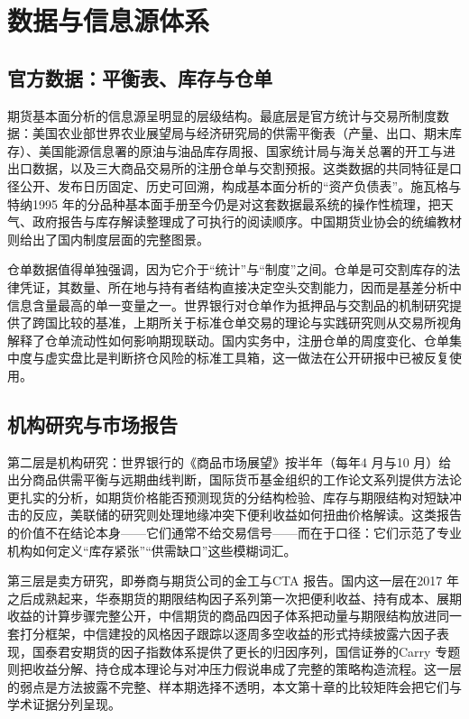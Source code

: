 \documentclass[12pt,a4paper]{ctexart}
\begin{document}
\section{数据与信息源体系}

\subsection{官方数据：平衡表、库存与仓单}

期货基本面分析的信息源呈明显的层级结构。最底层是官方统计与交易所制度数据：美国农业部世界农业展望局与经济研究局的供需平衡表（产量、出口、期末库存）、美国能源信息署的原油与油品库存周报、国家统计局与海关总署的开工与进出口数据，以及三大商品交易所的注册仓单与交割预报。这类数据的共同特征是口径公开、发布日历固定、历史可回溯，构成基本面分析的“资产负债表”。施瓦格与特纳1995 年的分品种基本面手册至今仍是对这套数据最系统的操作性梳理，把天气、政府报告与库存解读整理成了可执行的阅读顺序\cite{40}。中国期货业协会的统编教材则给出了国内制度层面的完整图景\cite{47}。

仓单数据值得单独强调，因为它介于“统计”与“制度”之间。仓单是可交割库存的法律凭证，其数量、所在地与持有者结构直接决定空头交割能力，因而是基差分析中信息含量最高的单一变量之一。世界银行对仓单作为抵押品与交割品的机制研究提供了跨国比较的基准\cite{21}，上期所关于标准仓单交易的理论与实践研究则从交易所视角解释了仓单流动性如何影响期现联动\cite{56}。国内实务中，注册仓单的周度变化、仓单集中度与虚实盘比是判断挤仓风险的标准工具箱，这一做法在公开研报中已被反复使用\cite{59, 61}。

\subsection{机构研究与市场报告}

第二层是机构研究：世界银行的《商品市场展望》按半年（每年4 月与10 月）给出分商品供需平衡与远期曲线判断\cite{55}，国际货币基金组织的工作论文系列提供方法论更扎实的分析，如期货价格能否预测现货的分结构检验\cite{50}、库存与期限结构对短缺冲击的反应\cite{51}，美联储的研究则处理地缘冲突下便利收益如何扭曲价格解读\cite{53}。这类报告的价值不在结论本身——它们通常不给交易信号——而在于口径：它们示范了专业机构如何定义“库存紧张”“供需缺口”这些模糊词汇。

第三层是卖方研究，即券商与期货公司的金工与CTA 报告。国内这一层在2017 年之后成熟起来，华泰期货的期限结构因子系列第一次把便利收益、持有成本、展期收益的计算步骤完整公开\cite{57}，中信期货的商品四因子体系把动量与期限结构放进同一套打分框架\cite{59}，中信建投的风格因子跟踪以逐周多空收益的形式持续披露六因子表现\cite{58}，国泰君安期货的因子指数体系提供了更长的归因序列\cite{60}，国信证券的Carry 专题则把收益分解、持仓成本理论与对冲压力假说串成了完整的策略构造流程\cite{61}。这一层的弱点是方法披露不完整、样本期选择不透明，本文第十章的比较矩阵会把它们与学术证据分列呈现。
\end{document}
